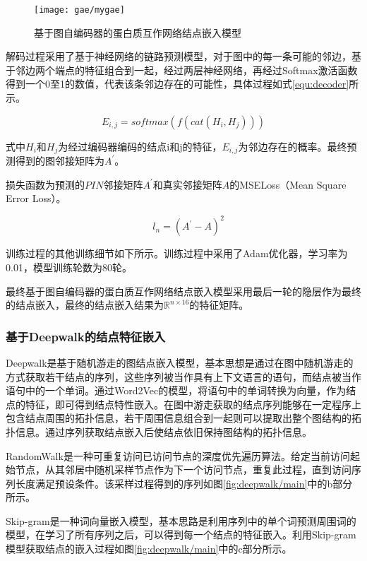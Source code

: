 \begin{figure}[htbp]
    \centering
    \texttt{[image: gae/mygae]}
    \caption{基于图自编码器的蛋白质互作网络结点嵌入模型}
    \label{fig:gae/mygae}
\end{figure}

解码过程采用了基于神经网络的链路预测模型，对于图中的每一条可能的邻边，基于邻边两个端点的特征组合到一起，经过两层神经网络，再经过Softmax激活函数得到一个0至1的数值，代表该条邻边存在的可能性，具体过程如式\ref{equ:decoder}所示。

\begin{equation}
    \label{equ:decoder}
    E_{i,j} =softmax(f(cat(H_i,H_j)))
\end{equation}

式中$H_i$和$H_j$为经过编码器编码的结点i和j的特征，$E_{i,j}$为邻边存在的概率。最终预测得到的图邻接矩阵为$A^{\prime}$。


损失函数为预测的$PIN$邻接矩阵$A^{\prime}$和真实邻接矩阵$A$的MSELoss（Mean Square Error Loss）。

\begin{equation}
    \label{equ:decoder}
    \quad l_n = \left( A^{\prime} - A \right)^2
\end{equation}


训练过程的其他训练细节如下所示。训练过程中采用了Adam优化器，学习率为0.01，模型训练轮数为80轮。

最终基于图自编码器的蛋白质互作网络结点嵌入模型采用最后一轮的隐层作为最终的结点嵌入，最终的结点嵌入结果为$\mathbb{R}^{n\times 16}$的特征矩阵。

\subsubsection{基于Deepwalk的结点特征嵌入}

Deepwalk是基于随机游走的图结点嵌入模型，基本思想是通过在图中随机游走的方式获取若干结点的序列，这些序列被当作具有上下文语言的语句，而结点被当作语句中的一个单词。通过Word2Vec的模型，将语句中的单词转换为向量，作为结点的特征，即可得到结点特性嵌入。在图中游走获取的结点序列能够在一定程序上包含结点周围的拓扑信息，若干周围信息组合到一起则可以提取出整个图结构的拓扑信息。通过序列获取结点嵌入后使结点依旧保持图结构的拓扑信息。

RandomWalk是一种可重复访问已访问节点的深度优先遍历算法。给定当前访问起始节点，从其邻居中随机采样节点作为下一个访问节点，重复此过程，直到访问序列长度满足预设条件。该采样过程得到的序列如图\ref{fig:deepwalk/main}中的b部分所示。

Skip-gram是一种词向量嵌入模型，基本思路是利用序列中的单个词预测周围词的模型，在学习了所有序列之后，可以得到每一个结点的特征嵌入。利用Skip-gram模型获取结点的嵌入过程如图\ref{fig:deepwalk/main}中的c部分所示。

